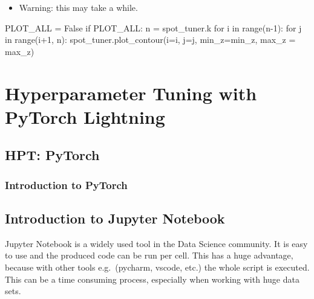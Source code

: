 \documentclass[
  letterpaper,
  DIV=11,
  numbers=noendperiod]{scrreprt}
\newenvironment{Shaded}{\begin{snugshade}}{\end{snugshade}}
\newcommand{\BuiltInTok}[1]{\textcolor[rgb]{0.00,0.23,0.31}{#1}}
\newcommand{\ControlFlowTok}[1]{\textcolor[rgb]{0.00,0.23,0.31}{#1}}
\newcommand{\DecValTok}[1]{\textcolor[rgb]{0.68,0.00,0.00}{#1}}
\newcommand{\KeywordTok}[1]{\textcolor[rgb]{0.00,0.23,0.31}{#1}}
\newcommand{\NormalTok}[1]{\textcolor[rgb]{0.00,0.23,0.31}{#1}}
\newcommand{\OperatorTok}[1]{\textcolor[rgb]{0.37,0.37,0.37}{#1}}
\newcommand{\VariableTok}[1]{\textcolor[rgb]{0.07,0.07,0.07}{#1}}
\providecommand{\tightlist}{%
  \setlength{\itemsep}{0pt}\setlength{\parskip}{0pt}}\usepackage{longtable,booktabs,array}
\begin{document}
\begin{itemize}
\tightlist
\item
  Warning: this may take a while.
\end{itemize}

\begin{Shaded}
\begin{Highlighting}[]
\NormalTok{PLOT\_ALL }\OperatorTok{=} \VariableTok{False}
\ControlFlowTok{if}\NormalTok{ PLOT\_ALL:}
\NormalTok{    n }\OperatorTok{=}\NormalTok{ spot\_tuner.k}
    \ControlFlowTok{for}\NormalTok{ i }\KeywordTok{in} \BuiltInTok{range}\NormalTok{(n}\OperatorTok{{-}}\DecValTok{1}\NormalTok{):}
        \ControlFlowTok{for}\NormalTok{ j }\KeywordTok{in} \BuiltInTok{range}\NormalTok{(i}\OperatorTok{+}\DecValTok{1}\NormalTok{, n):}
\NormalTok{            spot\_tuner.plot\_contour(i}\OperatorTok{=}\NormalTok{i, j}\OperatorTok{=}\NormalTok{j, min\_z}\OperatorTok{=}\NormalTok{min\_z, max\_z }\OperatorTok{=}\NormalTok{ max\_z)}
\end{Highlighting}
\end{Shaded}

\part{Hyperparameter Tuning with PyTorch Lightning}

\hypertarget{sec-hpt-pytorch}{%
\chapter{HPT: PyTorch}\label{sec-hpt-pytorch}}

\hypertarget{sec-hpt-pytorch-intro}{%
\section{Introduction to PyTorch}\label{sec-hpt-pytorch-intro}}

\cleardoublepage
{}
{}
\appendix

\hypertarget{introduction-to-jupyter-notebook}{%
\chapter{Introduction to Jupyter
Notebook}\label{introduction-to-jupyter-notebook}}

Jupyter Notebook is a widely used tool in the Data Science community. It
is easy to use and the produced code can be run per cell. This has a
huge advantage, because with other tools e.g.~(pycharm, vscode, etc.)
the whole script is executed. This can be a time consuming process,
especially when working with huge data sets.
\end{document}
